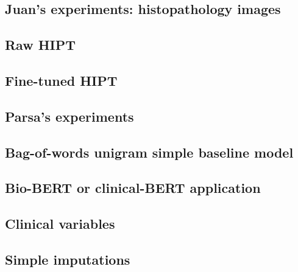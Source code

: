 \documentclass{article}%
\begin{document}
\subsection{}%
\label{subsec:}%

%
\subsection{Juan’s experiments: histopathology images }%
\label{subsec:Juansexperimentshistopathologyimages}%

%
\subsection{Raw HIPT }%
\label{subsec:RawHIPT}%

%
\subsection{Fine{-}tuned HIPT}%
\label{subsec:Fine{-}tunedHIPT}%

%
\subsection{}%
\label{subsec:}%

%
\subsection{Parsa’s experiments }%
\label{subsec:Parsasexperiments}%

%
\subsection{Bag{-}of{-}words unigram simple baseline model }%
\label{subsec:Bag{-}of{-}wordsunigramsimplebaselinemodel}%

%
\subsection{Bio{-}BERT or clinical{-}BERT application }%
\label{subsec:Bio{-}BERTorclinical{-}BERTapplication}%

%
\subsection{Clinical variables }%
\label{subsec:Clinicalvariables}%

%
\subsection{Simple imputations }%
\label{subsec:Simpleimputations}%
\end{document}
